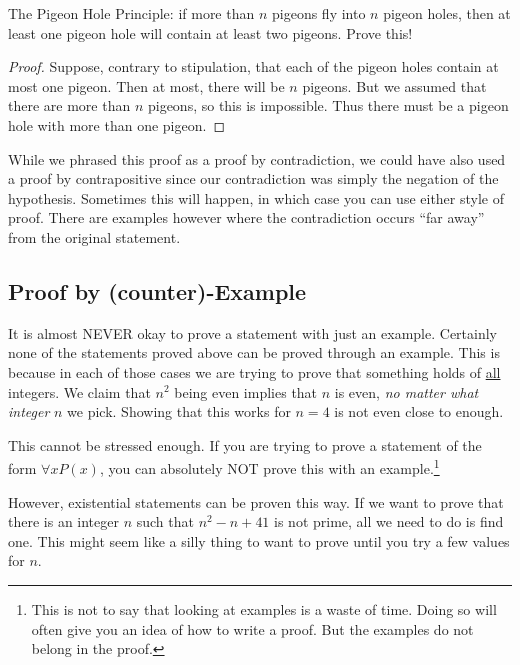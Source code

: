 \documentclass[12pt]{article}
\begin{document}
 
\begin{example}
The Pigeon Hole Principle: if more than $n$ pigeons fly into $n$ pigeon holes, then at least one pigeon hole will contain at least two pigeons.  Prove this!

\begin{proof}
Suppose, contrary to stipulation, that each of the pigeon holes contain at most one pigeon.  Then at most, there will be $n$ pigeons.  But we assumed that there are more than $n$ pigeons, so this is impossible.  Thus there must be a pigeon hole with more than one pigeon.
\end{proof}

While we phrased this proof as a proof by contradiction, we could have also used a proof by contrapositive since our contradiction was simply the negation of the hypothesis.  Sometimes this will happen, in which case you can use either style of proof.  There are examples however where the contradiction occurs ``far away'' from the original statement.
\end{example} 



 
 
\subsection*{Proof by (counter)-Example}

It is almost NEVER okay to prove a statement with just an example.  Certainly none of the statements proved above can be proved through an example.  This is because in each of those cases we are trying to prove that something holds of \underline{all} integers.  We claim that $n^2$ being even implies that $n$ is even, {\em no matter what integer} $n$ we pick.  Showing that this works for $n = 4$ is not even close to enough.  

This cannot be stressed enough.  If you are trying to prove a statement of the form $\forall x P(x)$, you can absolutely NOT prove this with an example.\footnote{This is not to say that looking at examples is a waste of time.  Doing so will often give you an idea of how to write a proof.  But the examples do not belong in the proof.}

However, existential statements can be proven this way.  If we want to prove that there is an integer $n$ such that $n^2-n+41$ is not prime, all we need to do is find one.  This might seem like a silly thing to want to prove until you try a few values for $n$.  
\end{document}
